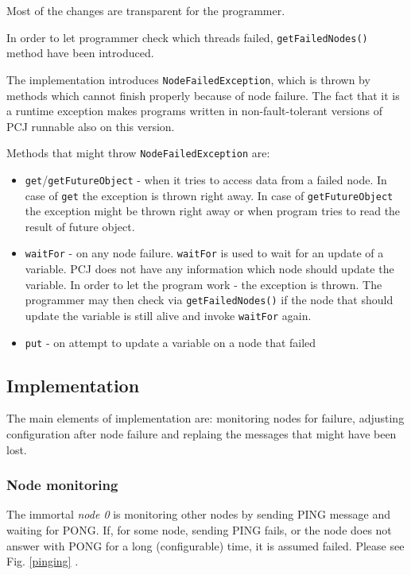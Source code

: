 \documentclass{llncs}
\newcommand{\inlinecode}{\texttt}
\begin{document}
Most of the changes are transparent for the programmer.

In order to let programmer check which threads failed, \inlinecode{getFailedNodes()} method have been introduced.

The implementation introduces \inlinecode{NodeFailedException}, which is thrown by methods which cannot finish properly because of node failure.
The fact that it is a runtime exception makes programs written in non-fault-tolerant versions of PCJ runnable also on this version.

Methods that might throw \inlinecode{NodeFailedException} are:
\vspace{-2mm}
\begin{itemize}
\item \inlinecode{get}/\inlinecode{getFutureObject} - when it tries to access data from a failed node.
In case of \inlinecode{get} the exception is thrown right away.
In case of \inlinecode{getFutureObject} the exception might be thrown right away or when program tries to read the result of future object.
\item \inlinecode{waitFor} - on any node failure. \inlinecode{waitFor} is used to wait for an update of a variable. PCJ does not have any information which node should update the variable.
 In order to let the program work - the exception is thrown.
 The programmer may then check via \inlinecode{getFailedNodes()} if the node that should update the variable is still alive and invoke \inlinecode{waitFor} again. %
\item \inlinecode{put} - on attempt to update a variable on a node that failed
\end{itemize}


\subsection{Implementation}

The main elements of implementation are: monitoring nodes for failure, adjusting configuration after node failure and replaing the messages that might have been lost.

\subsubsection{Node monitoring}
The immortal \emph{node 0} is monitoring other nodes by sending PING message and waiting for PONG.
If, for some node, sending PING fails, or the node does not answer with PONG for a long (configurable) time,
it is assumed failed. Please see Fig. \ref{pinging} .
\end{document}
